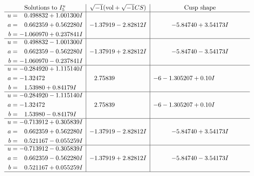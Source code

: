 \documentclass[1p]{elsarticle_modified}
\theoremstyle{definition}
\newcommand{\I}{\sqrt{-1}}
\begin{document}
$$\begin{array}{c|c|c}  
\text{Solutions to }I^u_{5}& \I (\text{vol} + \sqrt{-1}CS) & \text{Cusp shape}\\
 \hline 
\begin{aligned}
u &= \phantom{-}0.498832 + 1.001300 I \\
a &= \phantom{-}0.662359 + 0.562280 I \\
b &= -1.060970 + 0.237841 I\end{aligned}
 & -1.37919 - 2.82812 I & -5.84740 + 3.54173 I \\ \hline\begin{aligned}
u &= \phantom{-}0.498832 - 1.001300 I \\
a &= \phantom{-}0.662359 - 0.562280 I \\
b &= -1.060970 - 0.237841 I\end{aligned}
 & -1.37919 + 2.82812 I & -5.84740 - 3.54173 I \\ \hline\begin{aligned}
u &= -0.284920 + 1.115140 I \\
a &= -1.32472\phantom{ +0.000000I} \\
b &= \phantom{-}1.53980 + 0.84179 I\end{aligned}
 & \phantom{-}2.75839\phantom{ +0.000000I} &                  -6
-1.305207 + 0. 10   I\phantom{ +0.000000I} \\ \hline\begin{aligned}
u &= -0.284920 - 1.115140 I \\
a &= -1.32472\phantom{ +0.000000I} \\
b &= \phantom{-}1.53980 - 0.84179 I\end{aligned}
 & \phantom{-}2.75839\phantom{ +0.000000I} &                  -6
-1.305207 + 0. 10   I\phantom{ +0.000000I} \\ \hline\begin{aligned}
u &= -0.713912 + 0.305839 I \\
a &= \phantom{-}0.662359 + 0.562280 I \\
b &= \phantom{-}0.521167 - 0.055259 I\end{aligned}
 & -1.37919 - 2.82812 I & -5.84740 + 3.54173 I \\ \hline\begin{aligned}
u &= -0.713912 - 0.305839 I \\
a &= \phantom{-}0.662359 - 0.562280 I \\
b &= \phantom{-}0.521167 + 0.055259 I\end{aligned}
 & -1.37919 + 2.82812 I & -5.84740 - 3.54173 I\\
 \hline 
 \end{array}$$\newpage
\end{document}
